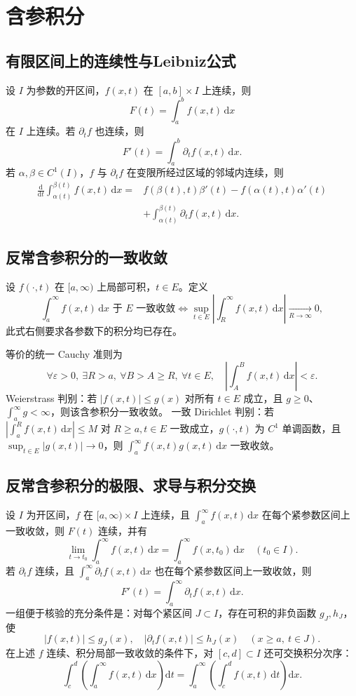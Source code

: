 \documentclass[../main.tex]{subfiles}
\begin{document}
\section{含参积分}
\subsection{有限区间上的连续性与Leibniz公式}
设 $I$ 为参数的开区间，$f(x,t)$ 在 $[a,b]\times I$ 上连续，则
\[
F(t)=\int_a^bf(x,t)\,\mathrm dx
\]
在 $I$ 上连续。若 $\partial_t f$ 也连续，则
\[
F'(t)=\int_a^b\partial_t f(x,t)\,\mathrm dx.
\]
若 $\alpha,\beta\in C^1(I)$，$f$ 与 $\partial_t f$ 在变限所经过区域的邻域内连续，则
\[
\begin{aligned}
\frac{\mathrm d}{\mathrm dt}\int_{\alpha(t)}^{\beta(t)}f(x,t)\,\mathrm dx
={}&f(\beta(t),t)\beta'(t)-f(\alpha(t),t)\alpha'(t)\\
&+\int_{\alpha(t)}^{\beta(t)}\partial_t f(x,t)\,\mathrm dx.
\end{aligned}
\]
\subsection{反常含参积分的一致收敛}
\par\pagebreak[0]\begin{samepage}
设 $f(\cdot,t)$ 在 $[a,\infty)$ 上局部可积，$t\in E$。定义
\[
\int_a^\infty f(x,t)\,\mathrm dx\text{ 于 }E\text{ 一致收敛}
\iff
\sup_{t\in E}\left|\int_R^\infty f(x,t)\,\mathrm dx\right|\xrightarrow[R\to\infty]{}0,
\]
此式右侧要求各参数下的积分均已存在。
\par\end{samepage}\pagebreak[0]
等价的统一 Cauchy 准则为
\[
\forall\varepsilon>0,\ \exists R>a,\ \forall B>A\ge R,\ \forall t\in E,
\quad\left|\int_A^B f(x,t)\,\mathrm dx\right|<\varepsilon.
\]
Weierstrass 判别：若 $|f(x,t)|\le g(x)$ 对所有 $t\in E$ 成立，且 $g\ge0$、$\int_a^\infty g<\infty$，则该含参积分一致收敛。
一致 Dirichlet 判别：若 $\left|\int_a^Rf(x,t)\,\mathrm dx\right|\le M$ 对 $R\ge a,t\in E$ 一致成立，$g(\cdot,t)$ 为 $C^1$ 单调函数，且 $\sup_{t\in E}|g(x,t)|\to0$，则 $\int_a^\infty f(x,t)g(x,t)\,\mathrm dx$ 一致收敛。
\subsection{反常含参积分的极限、求导与积分交换}
设 $I$ 为开区间，$f$ 在 $[a,\infty)\times I$ 上连续，且 $\int_a^\infty f(x,t)\,\mathrm dx$ 在每个紧参数区间上一致收敛，则 $F(t)$ 连续，并有
\[
\lim_{t\to t_0}\int_a^\infty f(x,t)\,\mathrm dx
=\int_a^\infty f(x,t_0)\,\mathrm dx\quad(t_0\in I).
\]
若 $\partial_t f$ 连续，且 $\int_a^\infty\partial_t f(x,t)\,\mathrm dx$ 也在每个紧参数区间上一致收敛，则
\[
F'(t)=\int_a^\infty\partial_t f(x,t)\,\mathrm dx.
\]
一组便于核验的充分条件是：对每个紧区间 $J\subset I$，存在可积的非负函数 $g_J,h_J$，使
\[
|f(x,t)|\le g_J(x),\quad |\partial_t f(x,t)|\le h_J(x)
\quad(x\ge a,\ t\in J).
\]
在上述 $f$ 连续、积分局部一致收敛的条件下，对 $[c,d]\subset I$ 还可交换积分次序：
\[
\int_c^d\!\left(\int_a^\infty f(x,t)\,\mathrm dx\right)\mathrm dt
=\int_a^\infty\!\left(\int_c^df(x,t)\,\mathrm dt\right)\mathrm dx.
\]
\end{document}
